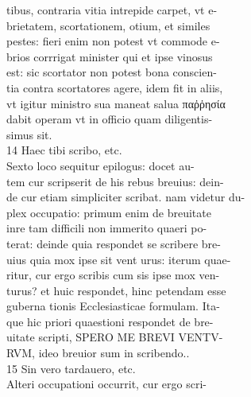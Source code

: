 \documentclass{article}
\begin{document}
\begin{pages}
                tibus, contraria vitia intrepide carpet, vt e- \\
                brietatem, scortationem, otium, et similes \\
                pestes: fieri enim non potest vt commode e- \\
                brios corrrigat minister qui et ipse vinosus \\
                est: sic scortator non potest bona conscien- \\
                tia contra scortatores agere, idem fit in aliis, \\
                vt igitur ministro sua maneat salua παῤῥησία \\
                dabit operam vt in officio quam diligentis- \\
                simus sit. \\
                14 Haec tibi scribo, etc. \\
                Sexto loco sequitur epilogus: docet au- \\
                tem cur scripserit de his rebus breuius: dein- \\
                de cur etiam simpliciter scribat. nam videtur du- \\
                plex occupatio: primum enim de breuitate \\
                inre tam difficili non immerito quaeri po- \\
                terat: deinde quia respondet se scribere bre- \\
                uius quia mox ipse sit vent urus: iterum quae- \\
                ritur, cur ergo scribis cum sis ipse mox ven- \\
                turus? et huic respondet, hinc petendam esse \\
                guberna tionis Ecclesiasticae formulam. Ita- \\
                que hic priori quaestioni respondet de bre- \\
                uitate scripti, SPERO ME BREVI VENTV- \\
                RVM, ideo breuior sum in scribendo.. \\
                15 Sin vero tardauero, etc. \\
                Alteri occupationi occurrit, cur ergo scri- \\

\end{pages}
\end{document}

